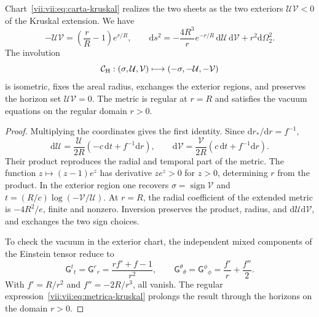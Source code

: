 \begin{theorem}
\label{vii:vii:thm:kruskal-hojas}
Chart~\eqref{vii:vii:eq:carta-kruskal} realizes the two sheets as the
two exteriors \(\mathcal U\mathcal V<0\) of the Kruskal
extension. We have
\begin{equation}
 -\mathcal U\mathcal V=\left(\frac rR-1\right)e^{r/R},\qquad
 \mathrm ds^2=-\frac{4R^3}{r}e^{-r/R}\,
                    \mathrm d\mathcal U\,\mathrm d\mathcal V
                    +r^2\mathrm d\Omega_2^2.
 \label{vii:vii:eq:metrica-kruskal}
\end{equation}
The involution
\begin{equation}
 \mathcal C_{\rm H}:(\sigma,\mathcal U,\mathcal V)
 \longmapsto(-\sigma,-\mathcal U,-\mathcal V)
 \label{vii:vii:eq:involucion-horizonte}
\end{equation}
is isometric, fixes the areal radius, exchanges the exterior regions, and preserves
the horizon set \(\mathcal U\mathcal V=0\).
The metric is regular at \(r=R\) and satisfies the vacuum equations
on the regular domain \(r>0\).
\end{theorem}
\begin{proof}
Multiplying the coordinates gives the first identity. Since
\(\mathrm dr_*/\mathrm dr=f^{-1}\),
\[
 \mathrm d\mathcal U=\frac{\mathcal U}{2R}
            (-c\,\mathrm dt+f^{-1}\mathrm dr),\qquad
 \mathrm d\mathcal V=\frac{\mathcal V}{2R}
            ( c\,\mathrm dt+f^{-1}\mathrm dr).
\]
Their product reproduces the radial and temporal part of the metric.
The function \(z\mapsto(z-1)e^z\) has derivative \(ze^z>0\)
for \(z>0\), determining \(r\) from the product.
In the exterior region one recovers
\(\sigma=\operatorname{sign}\mathcal V\) and
\(t=(R/c)\log(-\mathcal V/\mathcal U)\).
At \(r=R\), the radial coefficient of the extended metric is
\(-4R^2/e\), finite and nonzero. Inversion preserves the
product, radius, and \(\mathrm d\mathcal U\mathrm d\mathcal V\),
and exchanges the two sign choices.

To check the vacuum in the exterior chart, the independent mixed
components of the Einstein tensor reduce to
\[
 \mathsf G^t{}_t=\mathsf G^r{}_r
 =\frac{rf'+f-1}{r^2},\qquad
 \mathsf G^\theta{}_\theta=\mathsf G^\phi{}_\phi
 =\frac{f'}r+\frac{f''}2.
\]
With \(f'=R/r^2\) and \(f''=-2R/r^3\), all vanish.
The regular expression~\eqref{vii:vii:eq:metrica-kruskal} prolongs the
result through the horizons on the domain \(r>0\).
\end{proof}


